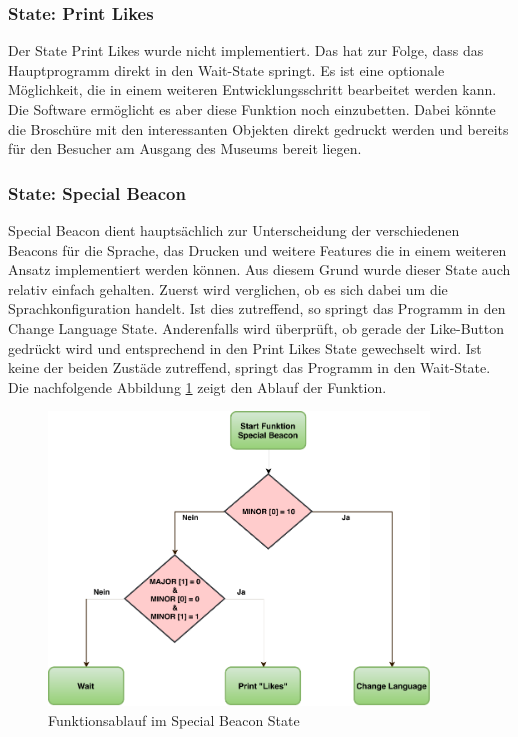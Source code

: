 \subsubsection*{State: Print \glqq Likes\grqq}

Der State Print {\glqq Likes\grqq} wurde nicht implementiert. Das hat zur Folge, dass das Hauptprogramm direkt in den Wait-State springt. Es ist eine optionale Möglichkeit, die in einem weiteren Entwicklungsschritt bearbeitet werden kann. Die Software ermöglicht es aber diese Funktion noch einzubetten. Dabei könnte die Broschüre mit den interessanten Objekten direkt gedruckt werden und bereits für den Besucher am Ausgang des Museums bereit liegen.

\subsubsection*{State: Special Beacon}
Special Beacon dient hauptsächlich zur Unterscheidung der verschiedenen Beacons für die Sprache, das Drucken und weitere Features die in einem weiteren Ansatz implementiert werden können. Aus diesem Grund wurde dieser State auch relativ einfach gehalten. Zuerst wird verglichen, ob es sich dabei um die Sprachkonfiguration handelt. Ist dies zutreffend, so springt das Programm in den Change Language State. Anderenfalls wird überprüft, ob gerade der Like-Button gedrückt wird und entsprechend in den Print {\glqq Likes\grqq} State gewechselt wird. Ist keine der beiden Zustäde zutreffend, springt das Programm in den Wait-State. Die nachfolgende Abbildung \ref{fig:specialBeaconState} zeigt den Ablauf der Funktion.

\begin{figure}[htbp!!!!]
	\centering
	\includegraphics[width=0.9\textwidth]{Data/SpecialBeacon_picture.pdf}
	\caption[Statemachine: Special Beacon]{Funktionsablauf im Special Beacon State}
	\label{fig:specialBeaconState}
\end{figure} 

